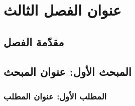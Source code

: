 
\chapter{عنوان الفصل الثالث}
\section*{مقدّمة الفصل}


\section{المبحث الأول: عنوان المبحث}
\subsection{المطلب الأول: عنوان المطلب}

